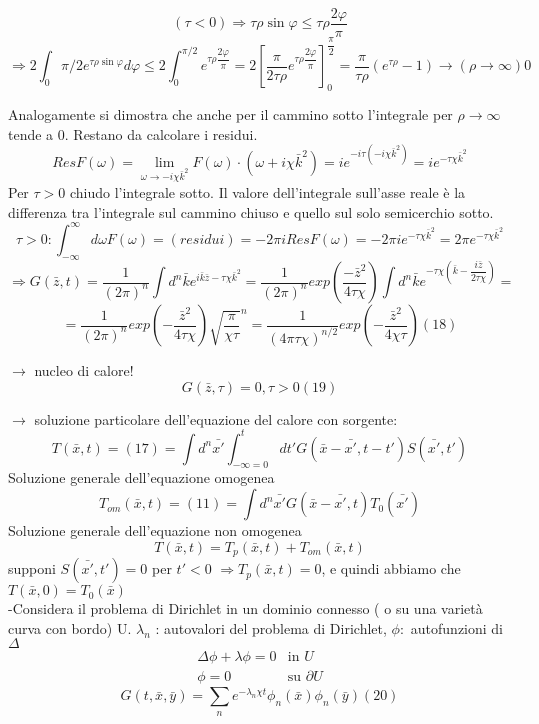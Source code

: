 \documentclass[a4paper,11pt]{report}
\begin{document}
$$
(\tau<0)\Rightarrow \tau\rho\sin\varphi \leq \tau\rho\dfrac{2\varphi}{\pi}
$$
$$
\Rightarrow 2\int_{0}{\pi/2}e^{\tau\rho\sin\varphi}d\varphi \leq 2\int_{0}^{\pi/2}e^{\tau\rho\dfrac{2\varphi}{\pi}}=2\left[\dfrac{\pi}{2\tau\rho}e^{\tau\rho\dfrac{2\varphi}{\pi}}\right]_{0}^{\dfrac{\pi}{2}}=\dfrac{\pi}{\tau\rho}(e^{\tau\rho}-1)\rightarrow (\rho \to \infty) 0
$$

Analogamente si dimostra che anche per il cammino sotto l'integrale per $\rho\to\infty$ tende a 0. Restano da calcolare i residui.
$$
ResF(\omega)=\lim_{\omega \to -i\chi\bar{k}^2} F(\omega)\cdot (\omega + i\chi\bar{k}^2)=ie^{-i\tau(-i\chi\bar{k}^2)}=ie^{-\tau\chi\bar{k}^2}
$$
Per $\tau>0$ chiudo l'integrale sotto. Il valore dell'integrale sull'asse reale è la differenza tra l'integrale sul cammino chiuso e quello sul solo semicerchio sotto.
$$
\tau>0:\int_{-\infty}^{\infty}d\omega F(\omega)=(residui)=-2\pi i ResF(\omega)=-2\pi i e^{-\tau\chi\bar{
k}^2}=2\pi e^{-\tau\chi\bar{k}^2}
$$
$$
\Rightarrow G(\bar{z},t)=\dfrac{1}{(2\pi)^n}\int d^n\bar{k}e^{i\bar{k}\bar{z}-\tau\chi\bar{k}^2} =\dfrac{1}{(2\pi)^n}exp\left(\dfrac{-\bar{z}^2}{4\tau\chi}\right) \int d^n\bar{k} e^{-\tau\chi\left(\bar{k}-\dfrac{i\bar{z}}{2\tau\chi}\right)}=
$$
\begin{equation}
=\dfrac{1}{(2\pi)^n}exp\left(-\dfrac{\bar{z}^2}{4\tau\chi}\right)\sqrt{\dfrac{\pi}{\chi\tau}}^n=\dfrac{1}{(4\pi\tau\chi)^{n/2}}exp\left(-\dfrac{\bar{z}^2}{4\chi\tau}\right) (18)
\end{equation}

$\rightarrow$ nucleo di calore!
\begin{equation}
G(\bar{z},\tau)=0,\tau>0 (19)
\end{equation}

$\rightarrow$ soluzione particolare dell'equazione del calore con sorgente:
$$
T(\bar{x},t)=(17)=\int d^n\bar{x'}\int_{-\infty=0}^{t}dt'G(\bar{x}-\bar{x'},t-t')S(\bar{x'},t')
$$
Soluzione generale dell'equazione omogenea
$$
T_{om}(\bar{x},t)=(11)=\int d^n\bar{x'}G(\bar{x}-\bar{x'},t)T_0(\bar{x'})
$$
Soluzione generale dell'equazione non omogenea
$$
T(\bar{x},t)=T_p(\bar{x},t)+T_{om}(\bar{x},t)
$$
supponi $S(\bar{x'},t')=0$ per $t'<0$ $\Rightarrow T_p(\bar{x},t)=0$, e quindi abbiamo che $T(\bar{x},0)=T_0(\bar{x})$\\
-Considera il problema di Dirichlet in un dominio connesso ( o su una varietà curva con bordo) U. $\lambda_n$ : autovalori del problema di Dirichlet, $\phi :$ autofunzioni di $\Delta$
$$\begin{matrix}
\Delta \phi + \lambda\phi =0 & \text{in } U \\
\phi=0 & \text{su }\partial U
\end{matrix}
$$
\begin{equation}
G(t,\bar{x},\bar{y})=\sum_{n}e^{-\lambda_n\chi t}\phi_n(\bar{x})\phi_n(\bar{y}) (20)
\end{equation}
\end{document}
